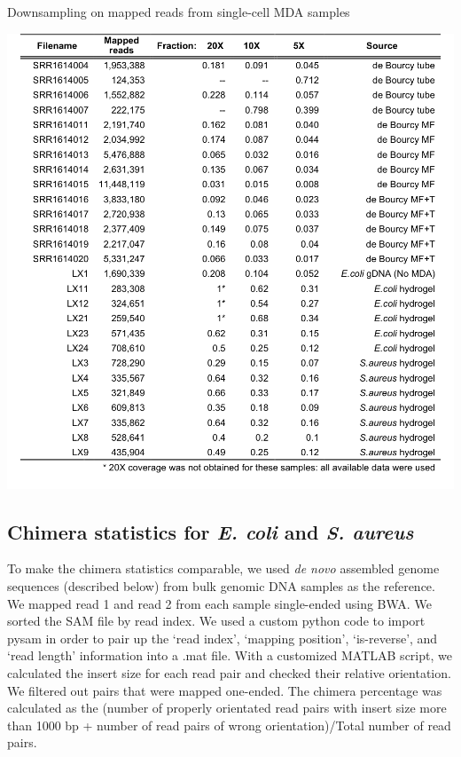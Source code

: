 \begin{table}
\caption{Downsampling on mapped reads from single-cell MDA samples}
\label{tab:DownsamplingESD}
\includegraphics[width=\linewidth]{./figures/DownsamplingESdeBourcy}
\end{table}

\subsection{Chimera statistics for \textit{E. coli} and \textit{S. aureus}}
To make the chimera statistics comparable, we used \textit{de novo} assembled genome sequences (described below) from bulk genomic DNA samples as the reference. We mapped read 1 and read 2 from each sample single-ended using BWA. We sorted the SAM file by read index. We used a custom python code to import pysam in order to pair up the `read index', `mapping position', `is-reverse', and `read length' information into a .mat file. With a customized MATLAB script, we calculated the insert size for each read pair and checked their relative orientation. We filtered out pairs that were mapped one-ended. The chimera percentage was calculated as the (number of properly orientated read pairs with insert size more than 1000 bp + number of read pairs of wrong orientation)\slash Total number of read pairs.

